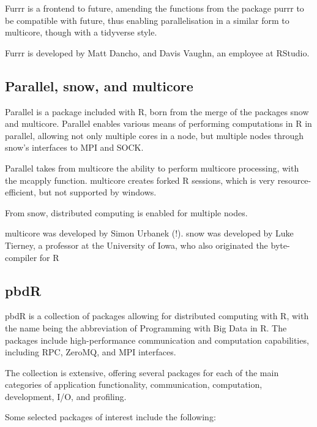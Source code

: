 Furrr is a frontend to future, amending the functions from the package
purrr to be compatible with future, thus enabling parallelisation in a
similar form to multicore, though with a tidyverse
style\cite{vaughan18}.

Furrr is developed by Matt Dancho, and Davis Vaughn, an employee at
RStudio.

\hypertarget{sec:parall-snow-mult}{%
    \subsection{Parallel, snow, and multicore}\label{sec:parall-snow-mult}}

Parallel is a package included with R, born from the merge of the
packages snow and multicore\cite{core:_packag}. Parallel enables
various means of performing computations in R in parallel, allowing not
only multiple cores in a node, but multiple nodes through snow's
interfaces to MPI and SOCK\cite{tierney18}.

Parallel takes from multicore the ability to perform multicore
processing, with the mcapply function. multicore creates forked R
sessions, which is very resource-efficient, but not supported by
windows.

From snow, distributed computing is enabled for multiple nodes.

multicore was developed by Simon Urbanek (!). snow was developed by Luke
Tierney, a professor at the University of Iowa, who also originated the
byte-compiler for R

\hypertarget{pbdr}{%
    \subsection{pbdR}\label{pbdr}}

pbdR is a collection of packages allowing for distributed computing with
R\cite{pbdBASEpackage}, with the name being the abbreviation of
Programming with Big Data in R. The packages include high-performance
communication and computation capabilities, including RPC, ZeroMQ, and
MPI interfaces.

The collection is extensive, offering several packages for each of the
main categories of application functionality, communication,
computation, development, I/O, and profiling.

Some selected packages of interest include the following:

